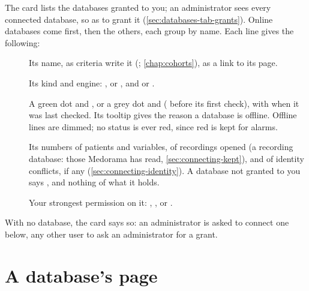 The card  lists the databases granted to you; an administrator sees every
connected database, so as to grant it (\cref{sec:databases-tab-grants}). Online databases come
first, then the others, each group by name. Each line gives the following:
\begin{description}
\item[] Its name, as criteria write it (; \cref{chap:cohorts}),
  as a link to its page.
\item[] Its kind and engine: ,  or , and
   or .
\item[] A green dot and , or a grey dot and  (
  before its first check), with when it was last checked. Its tooltip gives the reason a database
  is offline. Offline lines are dimmed; no status is ever red, since red is kept for alarms.
\item[] Its numbers of patients and variables, of recordings opened (a
  recording database: those Medorama has read, \cref{sec:connecting-kept}), and of identity
  conflicts, if any (\cref{sec:connecting-identity}). A database not
  granted to you says , and nothing of what it holds.
\item[] Your strongest permission on it: , ,  or
  .
\end{description}
With no database, the card says so: an administrator is asked to connect one below, any other
user to ask an administrator for a grant.

\section{A database's page}
\label{sec:databases-tab-page}

